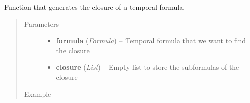 \documentclass[letterpaper,10pt,english]{sphinxmanual}
\begin{document}
\begin{fulllineitems}
\label{closure:closure.getClosure}
Function that generates the closure of a temporal formula.
\begin{quote}\begin{description}
\item[{Parameters}] \leavevmode\begin{itemize}
\item {} 
\textbf{formula} (\emph{Formula}) -- Temporal formula that we want to find the closure

\item {} 
\textbf{closure} (\emph{List}) -- Empty list to store the subformulas of the closure

\end{itemize}

\item[{Example }] \leavevmode
\end{description}\end{quote}


\end{fulllineitems}
\end{document}
